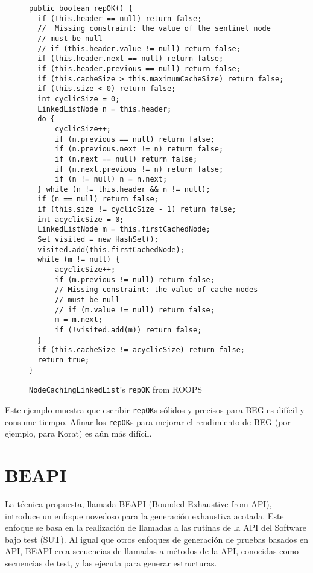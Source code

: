 \begin{figure}[!thb]
\begin{lstlisting}
public boolean repOK() {
  if (this.header == null) return false;
  //  Missing constraint: the value of the sentinel node
  // must be null  
  // if (this.header.value != null) return false;
  if (this.header.next == null) return false;
  if (this.header.previous == null) return false;
  if (this.cacheSize > this.maximumCacheSize) return false;
  if (this.size < 0) return false;
  int cyclicSize = 0;
  LinkedListNode n = this.header;
  do {
      cyclicSize++;
      if (n.previous == null) return false;
      if (n.previous.next != n) return false;
      if (n.next == null) return false;
      if (n.next.previous != n) return false;
      if (n != null) n = n.next;
  } while (n != this.header && n != null);
  if (n == null) return false;
  if (this.size != cyclicSize - 1) return false;
  int acyclicSize = 0;
  LinkedListNode m = this.firstCachedNode;
  Set visited = new HashSet();
  visited.add(this.firstCachedNode);
  while (m != null) {
      acyclicSize++;
      if (m.previous != null) return false;
      // Missing constraint: the value of cache nodes
      // must be null
      // if (m.value != null) return false;
      m = m.next;
      if (!visited.add(m)) return false;
  }
  if (this.cacheSize != acyclicSize) return false;
  return true;
}
\end{lstlisting}
\caption{\texttt{NodeCachingLinkedList}'s \texttt{repOK} from \textsf{ROOPS}}
\label{fig:NCL-repOK}
\end{figure}

Este ejemplo muestra que escribir \texttt{repOK}s sólidos y precisos para BEG es difícil y consume tiempo. Afinar los \texttt{repOK}s para mejorar el rendimiento de BEG (por ejemplo, para \textsf{Korat}) es aún más difícil. 


\section[BEAPI]{BEAPI}
\label{sec:beapiIntro}
La técnica propuesta, llamada \textsf{BEAPI} (Bounded Exhaustive from API), introduce un enfoque novedoso para la generación exhaustiva acotada. Este enfoque se basa en la realización de llamadas a las rutinas de la API del Software bajo test (SUT). Al igual que otros enfoques de generación de pruebas basados en API, \textsf{BEAPI} crea secuencias de llamadas a métodos de la API, conocidas como secuencias de test, y las ejecuta para generar estructuras.

